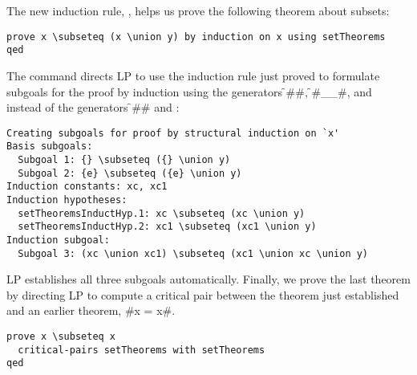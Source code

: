 The new induction rule, , helps us prove the following
theorem about subsets:
\begin{verbatim}
prove x \subseteq (x \union y) by induction on x using setTheorems
qed
\end{verbatim}
The  command directs LP to use the induction rule just proved to
formulate subgoals for the proof by induction using the generators \f#{}#,
\f#{__}#, and \fq{\union} instead of the generators \f#{}# and :
\begin{verbatim}
Creating subgoals for proof by structural induction on `x'
Basis subgoals:
  Subgoal 1: {} \subseteq ({} \union y)
  Subgoal 2: {e} \subseteq ({e} \union y)
Induction constants: xc, xc1
Induction hypotheses:
  setTheoremsInductHyp.1: xc \subseteq (xc \union y)
  setTheoremsInductHyp.2: xc1 \subseteq (xc1 \union y)
Induction subgoal:
  Subgoal 3: (xc \union xc1) \subseteq (xc1 \union xc \union y)
\end{verbatim}
LP establishes all three subgoals automatically.
\p
Finally, we prove the last theorem by directing LP to compute a critical pair
between the theorem just established and an earlier theorem, 
\fq#x \union {} = x#.
\begin{verbatim}
prove x \subseteq x
  critical-pairs setTheorems with setTheorems
qed
\end{verbatim}
